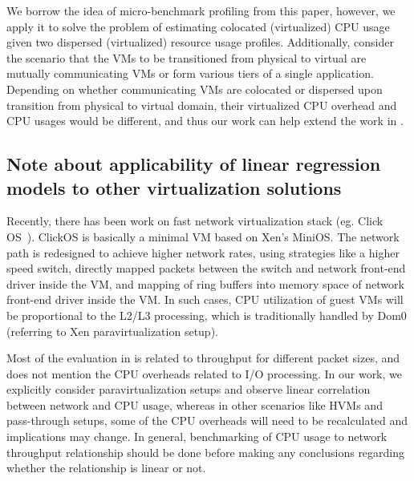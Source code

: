 
We borrow the idea of micro-benchmark profiling from this paper, however,
we apply it to solve the problem of estimating colocated (virtualized)
CPU usage given two dispersed (virtualized) resource usage profiles.
Additionally, consider the scenario that the VMs to be transitioned from 
physical to virtual are mutually
communicating VMs or form various tiers of a single application. 
Depending on whether communicating VMs are colocated or dispersed upon
transition from physical to virtual domain, their virtualized CPU overhead
and CPU usages would be different, and thus our work can help extend 
the work in \cite{profiling-and-modeling}.

\subsection{Note about applicability of linear regression models to other virtualization solutions}
Recently, there has been work on fast network virtualization 
stack (eg. Click OS~\cite{clickos}). 
ClickOS is basically a minimal VM based on Xen’s MiniOS. The network path is 
redesigned to achieve higher network rates, using strategies like a higher 
speed switch, directly mapped packets between the switch and network front-end 
driver inside the VM, and mapping of ring buffers into memory space of network 
front-end driver inside the VM. In such cases, CPU utilization of guest VMs 
will be proportional to the L2/L3 processing, which is traditionally handled 
by Dom0 (referring to Xen paravirtualization setup). 

Most of the evaluation in \cite{clickos} is related to throughput for 
different packet sizes, and does not mention the CPU overheads related to 
I/O processing. In our work, we explicitly consider paravirtualization 
setups and observe linear correlation between network and CPU usage, whereas 
in other scenarios like HVMs and pass-through setups, some of the CPU 
overheads will need to be recalculated and implications may change. 
In general, benchmarking of CPU usage to network throughput relationship 
should be done before making any conclusions regarding whether the 
relationship is linear or not. 

